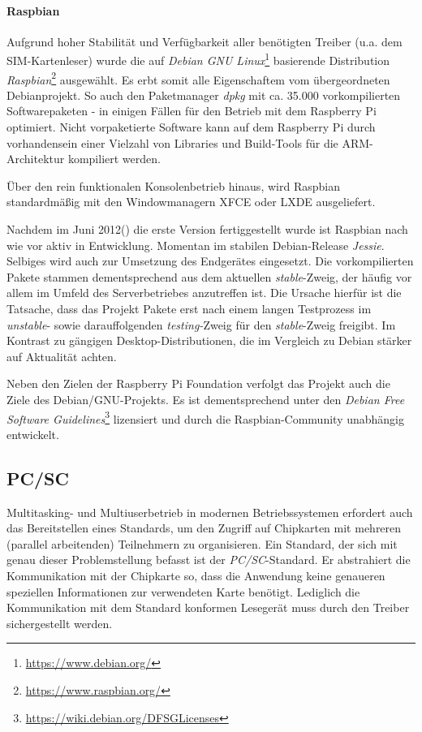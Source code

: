 \paragraph{Raspbian}
Aufgrund hoher Stabilität und Verfügbarkeit aller benötigten Treiber
(u.a. dem SIM-Kartenleser) wurde die auf \textit{Debian GNU Linux}\footnote{\url{https://www.debian.org/}}
basierende Distribution \textit{Raspbian}\footnote{\url{https://www.raspbian.org/}} ausgewählt.
Es erbt somit alle Eigenschaftem vom übergeordneten Debianprojekt.
So auch den Paketmanager \textit{dpkg} mit ca. 35.000 vorkompilierten
Softwarepaketen - in einigen Fällen für den Betrieb mit dem
Raspberry Pi optimiert. Nicht vorpaketierte Software kann auf dem Raspberry
Pi durch vorhandensein einer Vielzahl von Libraries und Build-Tools
für die ARM-Architektur kompiliert werden.

Über den rein funktionalen Konsolenbetrieb hinaus, wird Raspbian standardmäßig mit den
Windowmanagern XFCE oder LXDE ausgeliefert.

Nachdem im Juni 2012(\cite{raspbianweb}) die erste
Version fertiggestellt wurde ist Raspbian nach wie vor aktiv
in Entwicklung. Momentan im stabilen Debian-Release \textit{Jessie}.
Selbiges wird auch zur Umsetzung des Endgerätes eingesetzt.
Die vorkompilierten Pakete stammen dementsprechend aus dem aktuellen
\textit{stable}-Zweig, der häufig vor allem im Umfeld des Serverbetriebes
anzutreffen ist. Die Ursache hierfür ist die Tatsache, dass das
Projekt Pakete erst nach einem langen Testprozess im \textit{unstable}-
sowie darauffolgenden \textit{testing-}Zweig für den \textit{stable}-Zweig
freigibt. Im Kontrast zu gängigen Desktop-Distributionen, die
im Vergleich zu Debian stärker auf Aktualität achten.

Neben den Zielen der Raspberry Pi Foundation verfolgt das Projekt
auch die Ziele des Debian/GNU-Projekts. Es ist dementsprechend unter
den \textit{Debian Free Software Guidelines}\footnote{\url{https://wiki.debian.org/DFSGLicenses}}
lizensiert und durch die Raspbian-Community unabhängig entwickelt.

\subsection{PC/SC}
Multitasking- und Multiuserbetrieb in modernen Betriebssystemen erfordert
auch das Bereitstellen eines Standards, um den Zugriff auf Chipkarten
mit mehreren (parallel arbeitenden) Teilnehmern zu organisieren. Ein Standard, der sich mit genau
dieser Problemstellung befasst ist der \textit{\ac{PC/SC}}-Standard.
Er abstrahiert die Kommunikation mit der Chipkarte so,
dass die Anwendung keine genaueren speziellen Informationen zur verwendeten
Karte benötigt. Lediglich die Kommunikation mit dem Standard
konformen Lesegerät muss durch den Treiber sichergestellt werden.

